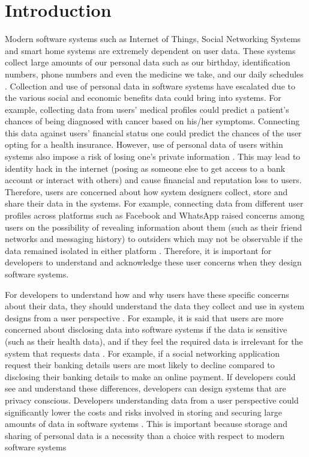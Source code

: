 \documentclass{sigchi}
\begin{document}
\section{Introduction} 

Modern software systems such as Internet of Things, Social Networking Systems and smart home systems are extremely dependent on user data. These systems collect large amounts of our personal data such as our birthday, identification numbers, phone numbers and even the medicine we take, and our daily schedules \cite {new2013google, the2017the}. Collection and use of personal data in software systems have escalated due to the various social and economic benefits data could bring into systems. For example, collecting data from users' medical profiles could predict a patient's chances of being diagnosed with cancer based on his/her symptoms. Connecting this data against users' financial status one could predict the chances of the user opting for a health insurance. However, use of personal data of users within systems also impose a risk of losing one's private information \cite {european2016data}. This may lead to identity hack in the internet (posing as someone else to get access to a bank account or interact with others) and cause financial and reputation loss to users. Therefore, users are concerned about how system designers collect, store and share their data in the systems. For example, connecting data from different user profiles across platforms such as Facebook and WhatsApp raised concerns among users on the possibility of revealing information about them (such as their friend networks and messaging history) to outsiders which may not be observable if the data remained isolated in either platform \cite {zingales2017between}. Therefore, it is important for developers to understand and acknowledge these user concerns when they design software systems.

For developers to understand how and why users have these specific concerns about their data, they should understand the data they collect and use in system designs from a user perspective \cite {marr2015big, tene2012big}. For example, it is said that users are more concerned about disclosing data into software systems if the data is sensitive (such as their health data), and if they feel the required data is irrelevant for the system that requests data \cite {malheiros2013fairly, malhotra2004internet}. For example, if a social networking application request their banking details users are most likely to decline compared to disclosing their banking details to make an online payment. If developers could see and understand these differences, developers can design systems that are privacy conscious. Developers understanding data from a user perspective could significantly lower the costs and risks involved in storing and securing large amounts of data in software systems \cite {marr2015big, tene2012big, rubinstein2012big}. This is important because storage and sharing of personal data is a necessity than a choice with respect to modern software systems \cite {marr2015big, tene2012big}
\end{document}

